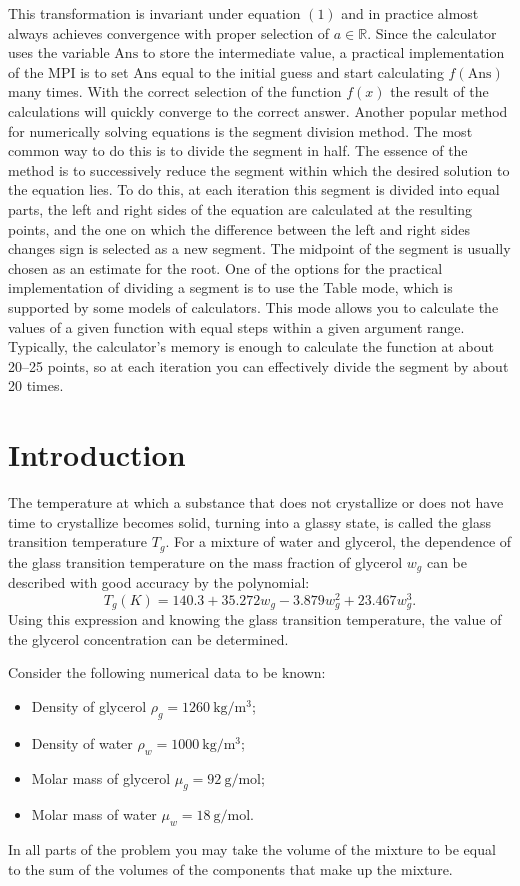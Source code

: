 \documentclass[11pt,a4paper]{article}
\begin{document}
This transformation is invariant under equation $(1)$ and in practice almost always achieves convergence with proper selection of $a\in \mathbb R$. Since the calculator uses the variable $\mathrm{Ans}$ to store the intermediate value, a practical implementation of the MPI is to set $\mathrm{Ans}$ equal to the initial guess and start calculating $f(\mathrm{Ans})$ many times. With the correct selection of the function $f(x)$ the result of the calculations will quickly converge to the correct answer. Another popular method for numerically solving equations is the segment division method. The most common way to do this is to divide the segment in half. The essence of the method is to successively reduce the segment within which the desired solution to the equation lies. To do this, at each iteration this segment is divided into equal parts, the left and right sides of the equation are calculated at the resulting points, and the one on which the difference between the left and right sides changes sign is selected as a new segment. The midpoint of the segment is usually chosen as an estimate for the root. One of the options for the practical implementation of dividing a segment is to use the Table mode, which is supported by some models of calculators. This mode allows you to calculate the values of a given function with equal steps within a given argument range. Typically, the calculator's memory is enough to calculate the function at about 20–25 points, so at each iteration you can effectively divide the segment by about 20 times.

\section*{Introduction}

The temperature at which a substance that does not crystallize or does not have time to crystallize becomes solid, turning into a glassy state, is called the glass transition temperature $T_g$. For a mixture of water and glycerol, the dependence of the glass transition temperature on the mass fraction of glycerol $w_g$ can be described with good accuracy by the polynomial: 
\[T_g(K)=140.3+35.272w_g-3.879w_g^2+ 23.467w_g^3.\tag{2}\]
Using this expression and knowing the glass transition temperature, the value of the glycerol concentration can be determined.

Consider the following numerical data to be known:
\begin{itemize}
    \item Density of glycerol $\rho_g = 1260~\mathrm{kg/m^3}$;
    \item Density of water $\rho_w = 1000~\mathrm{kg/m^3}$;
    \item Molar mass of glycerol $\mu_g = 92~\mathrm{g/mol}$;
    \item Molar mass of water $\mu_w = 18~\mathrm{g/mol}$.
\end{itemize}
In all parts of the problem you may take the volume of the mixture to be equal to the sum of the volumes of the components that make up the mixture.
\end{document}
